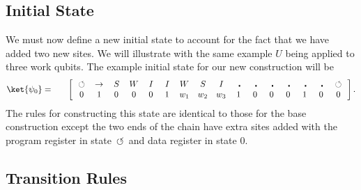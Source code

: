 \documentclass[11pt,letterpaper]{article}
\newcommand{\<}{\langle}
\renewcommand{\>}{\rangle}
\newcommand{\tur}{\,\circlearrowleft\,}   %
\newcommand{\bul}{\:\:\centerdot\:}       %
\newcommand{\iga}{\:I\,}                  %
\newcommand{\wga}{W}						%
\newcommand{\sga}{\:S\,}					%
\begin{document}
\subsection{Initial State}
We must now define a new initial state to account for the fact that we have added two new sites. We will illustrate with the same example $U$ being applied to three work qubits. The example initial state for our new construction will be
\begin{eqnarray}
	\ket{\psi_{0}} &=& \quad \left[ \begin{array}{cccccccccccccccc}
		\tur & \rightarrow & \sga & \wga & \iga & \iga & 
		\wga & \sga & \iga & \bul &
		\bul & \bul & \bul & \bul & \bul & \tur
		\\		
		0 & 1    & 0    & 0    & 0    & 1    & 
		w_1 & w_2 & w_3
		 &
		1    & 0    & 0    & 0    & 1	& 0	& 0
 	\end{array} \right]. \label{psi02}
\end{eqnarray}
The rules for constructing this state are identical to those for the base construction except the two ends of the chain have extra sites added with the program register in state $\tur$ and data register in state $0$.

\subsection{Transition Rules}
\end{document}

